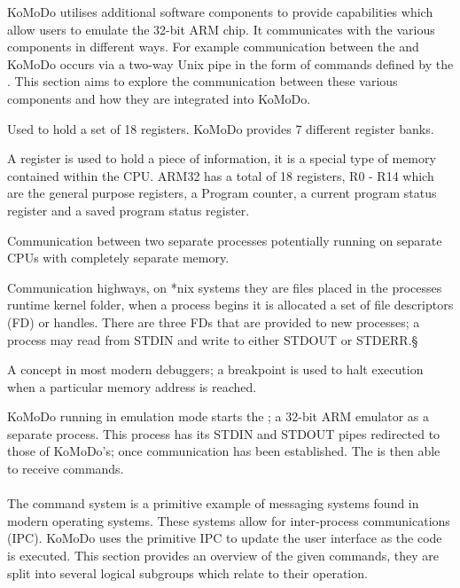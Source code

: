 KoMoDo utilises additional software components to provide capabilities which allow users to emulate the 32-bit ARM chip. It communicates with the various components in different ways. For example communication between the  and KoMoDo occurs via a two-way Unix pipe in the form of commands defined by the . This section aims to explore the communication between these various components and how they are integrated into KoMoDo.

  \begin{description}[leftmargin=!,labelwidth=\widthof{\bfseries \footnotesize inter process communication}]
    \item[\footnotesize Register bank] Used to hold a set of 18 registers. KoMoDo provides 7 different register banks.
    \item[\footnotesize Register] A register is used to hold a piece of information, it is a special type of memory contained within the CPU. ARM32 has a total of 18 registers, R0 - R14 which are the general purpose registers, a Program counter, a current program status register and a saved program status register.
    \item[\footnotesize Inter process communication] Communication between two separate processes potentially running on separate CPUs with completely separate memory.
    \item[\footnotesize (*nix) pipes] Communication highways, on *nix systems they are files placed in the processes runtime kernel folder, when a process begins it is allocated a set of file descriptors (FD) or handles. There are three FDs that are provided to new processes; a process may read from STDIN and write to  either STDOUT or STDERR.§
    \item[\footnotesize breakpoint] A concept in most modern debuggers; a breakpoint is used to halt execution when a particular memory address is reached.
  \end{description}
%
KoMoDo running in emulation mode starts the ; a 32-bit ARM emulator as a separate process. This process has its STDIN and STDOUT pipes redirected to those of KoMoDo's; once communication has been established. The  is then able to receive commands.\\\\
%
The command system is a primitive example of messaging systems found in modern operating systems. These systems allow for inter-process communications (IPC). KoMoDo uses the primitive IPC to update the user interface as the code is executed. This section provides an overview of the given commands, they are split into several logical subgroups which relate to their operation.
